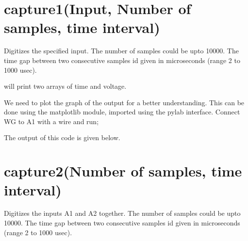 \documentclass[a4paper,12pt,english]{sphinxmanual}
\begin{document}
\section{capture1(Input, Number of samples, time interval)}
\label{\detokenize{9.0:capture1-input-number-of-samples-time-interval}}
Digitizes the specified input. The number of samples could be upto
10000. The time gap between two consecutive samples id given in
microseconds (range 2 to 1000 usec).

\begin{sphinxVerbatim}[commandchars=\\\{\}]
   
\end{sphinxVerbatim}

will print two arrays of time and voltage.

We need to plot the graph of the output for a better understanding. This
can be done using the matplotlib module, imported using the pylab
interface. Connect WG to A1 with a wire and run;

\begin{sphinxVerbatim}[commandchars=\\\{\}]
   
 
    
\end{sphinxVerbatim}

The output of this code is given below.


\section{capture2(Number of samples, time interval)}
\label{\detokenize{9.0:capture2-number-of-samples-time-interval}}
Digitizes the inputs A1 and A2 together. The number of samples could be
upto 10000. The time gap between two consecutive samples id given in
microseconds (range 2 to 1000 usec).
\end{document}
